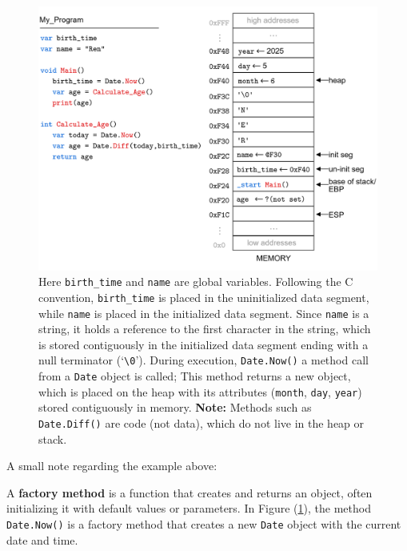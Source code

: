 \begin{figure}[!ht]
    \centering
    \includegraphics[width=\textwidth]{./Sections/stacks_heaps/heap_array.png}
    \caption{Here \texttt{birth\_time} and \texttt{name} are global variables. Following the C convention, \texttt{birth\_time} is placed in the 
    uninitialized data segment, while \texttt{name} is placed in the initialized data segment. Since \texttt{name} is a string, it holds a 
    reference to the first character in the string, which is stored contiguously in the initialized data segment ending with a null terminator (`\texttt{\textbackslash 0}').
    During execution, \texttt{Date.Now()} a method call from a \texttt{Date} object is called; This method returns a new object, which is placed on the heap with 
    its attributes (\texttt{month}, \texttt{day}, \texttt{year}) stored contiguously in memory. \textbf{Note:} Methods such as \texttt{Date.Diff()} are code (not data), 
    which do not live in the heap or stack.}
    \label{fig:heap_array}
\end{figure}

\noindent
A small note regarding the example above:
\begin{Def}

    A \textbf{factory method} is a function that creates and returns an object, often initializing it with default values or parameters.
    In Figure (\ref{fig:heap_array}), the method \texttt{Date.Now()} is a factory method that creates a new \texttt{Date} object with the current date and time.
\end{Def}

